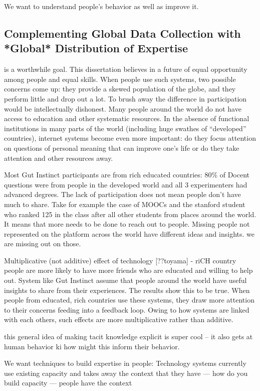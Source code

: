 We want to understand people's behavior as well as improve it. 

\subsection{Complementing Global Data Collection with *Global* Distribution of Expertise} is a worthwhile goal. This dissertation believes in a future of equal opportunity among people and equal skills. When people use such systems, two possible concerns come up: they provide a skewed population of the globe, and they perform little and drop out a lot.  To brush away the difference in participation would be intellectually dishonest. Many people around the world do not have access to education and other systematic resources. In the absence of functional institutions in many parts of the world (including huge swathes of “developed” countries), internet systems become even more important:  do they focus attention on questions of personal meaning that can improve one’s life or do they take attention and other resources away. 

Most Gut Instinct participants are from rich educated countries: 80\% of Docent questions were from people in the developed world and all 3 experimenters had advanced degrees. The lack of participation does not mean people don’t have much to share. Take for example the case of MOOCs and the stanford student who ranked 125 in the class after all other students from places around the world. It means that more needs to be done  to reach out to people.  Missing people not represented on the platform across the world have different ideas and insights. we are missing out on those. 

Multiplicative (not additive) effect of technology [??toyama] - riCH country people are more likely to have more friends who are educated and willing to help out. System like Gut Instinct assume that people around the world have useful insights to share from their experiences. The results show this to be true. When people from educated, rich countries use these systems, they draw more attention to their concerns feeding into a feedback loop. Owing to how systems are linked with each others, such effects are more multiplicative rather than additive. 

     this general idea of making tacit knowledge explicit is super cool -- it also gets at human behavior ki how might this inform their behavior.

We want techniques to build expertise in people: Technology systems currently use existing capacity and takes away the context that they have — how do you build capacity — people have the context

